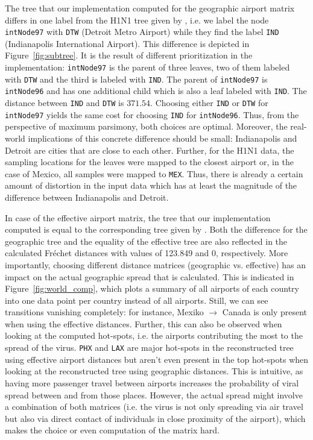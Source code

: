 \documentclass{article}
\begin{document}
The tree that our implementation computed for the geographic airport matrix
differs in one label from the H1N1 tree given by
\cite{reimeringPhylogeographicReconstructionUsing2020}, i.e. we label the node
\texttt{intNode97} with \texttt{DTW} (Detroit Metro Airport) while they find the label
\texttt{IND} (Indianapolis International Airport). This difference is depicted
in Figure~\ref{fig:subtree}.
It is the result of different prioritization in the implementation:
\texttt{intNode97} is the parent of three leaves, two of them labeled with
\texttt{DTW} and the third is labeled with \texttt{IND}. The parent of
\texttt{intNode97} is \texttt{intNode96} and has one additional child which is
also a leaf labeled with \texttt{IND}. The distance between \texttt{IND}
and \texttt{DTW} is $371.54$. Choosing either \texttt{IND} or \texttt{DTW} for
\texttt{intNode97} yields the same cost for choosing \texttt{IND} for
\texttt{intNode96}. Thus, from the perspective of maximum parsimony, both
choices are optimal. Moreover, the real-world implications of this concrete
difference should be small: Indianapolis and Detroit are cities that are close
to each other. Further, for the H1N1 data,  the sampling locations for the
leaves were mapped to the closest airport or, in the case of Mexico, all samples 
were mapped to \texttt{MEX}. Thus, there is already a certain amount of
distortion in the input data \cite{reimeringDistanceMatricesParsimonious2019} 
which has at least the magnitude of the difference between Indianapolis and
Detroit.

In case of the effective airport matrix, the tree that our implementation computed is
equal to the corresponding tree given by
\cite{reimeringPhylogeographicReconstructionUsing2020}. Both the difference for
the geographic tree and the equality of the effective tree are also reflected in
the calculated Fr\'{e}chet distances with values of 123.849 and 0, respectively. More importantly, choosing different
distance matrices (geographic vs. effective) has an impact on the actual
geographic spread that is calculated. This is indicated in Figure~\ref{fig:world_comp}, which plots a summary of all airports of each country into one data point per country instead of all airports. Still, we can see
transitions vanishing completely: for instance, Mexiko $\rightarrow$ Canada is only present
when using the effective distances. Further, this can also be observed when looking at the computed hot-spots, i.e. the airports contributing the most to the spread of the virus. \texttt{PHX} and \texttt{LAX} are major hot-spots in the reconstructed tree using effective airport distances but aren't even present in the top hot-spots when looking at the reconstructed tree using geographic distances. This is intuitive, as having more passenger
travel between airports increases the probability of viral spread between and from those
places. However, the actual spread might involve a combination of both matrices (i.e. the virus is not only spreading via air travel but also via direct
contact of individuals in close proximity of the airport), which makes the
choice or even computation of the matrix hard.
\end{document}
